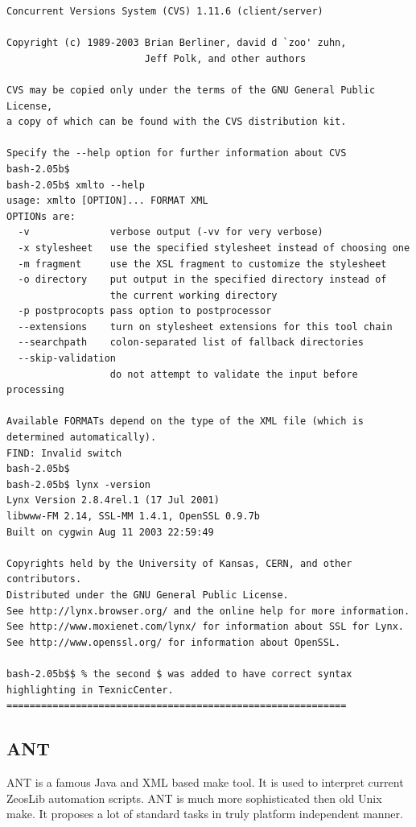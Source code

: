 \documentclass[a4paper,12pt,oneside]{book}
\begin{document}
\begin{enumerate}
\begin{verbatim}
Concurrent Versions System (CVS) 1.11.6 (client/server)

Copyright (c) 1989-2003 Brian Berliner, david d `zoo' zuhn,
                        Jeff Polk, and other authors

CVS may be copied only under the terms of the GNU General Public License,
a copy of which can be found with the CVS distribution kit.

Specify the --help option for further information about CVS
bash-2.05b$
bash-2.05b$ xmlto --help
usage: xmlto [OPTION]... FORMAT XML
OPTIONs are:
  -v              verbose output (-vv for very verbose)
  -x stylesheet   use the specified stylesheet instead of choosing one
  -m fragment     use the XSL fragment to customize the stylesheet
  -o directory    put output in the specified directory instead of
                  the current working directory
  -p postprocopts pass option to postprocessor
  --extensions    turn on stylesheet extensions for this tool chain
  --searchpath    colon-separated list of fallback directories
  --skip-validation
                  do not attempt to validate the input before processing

Available FORMATs depend on the type of the XML file (which is
determined automatically).
FIND: Invalid switch
bash-2.05b$
bash-2.05b$ lynx -version
Lynx Version 2.8.4rel.1 (17 Jul 2001)
libwww-FM 2.14, SSL-MM 1.4.1, OpenSSL 0.9.7b
Built on cygwin Aug 11 2003 22:59:49

Copyrights held by the University of Kansas, CERN, and other contributors.
Distributed under the GNU General Public License.
See http://lynx.browser.org/ and the online help for more information.
See http://www.moxienet.com/lynx/ for information about SSL for Lynx.
See http://www.openssl.org/ for information about OpenSSL.

bash-2.05b$$ % the second $ was added to have correct syntax highlighting in TexnicCenter.
===========================================================
    \end{verbatim}
\end{enumerate}

\subsection{ANT}

ANT is a famous Java and XML based make tool.
It is used to interpret current ZeosLib automation scripts.
ANT is much more sophisticated then old Unix make.
It proposes a lot of standard tasks in truly platform independent manner.
\end{document}
